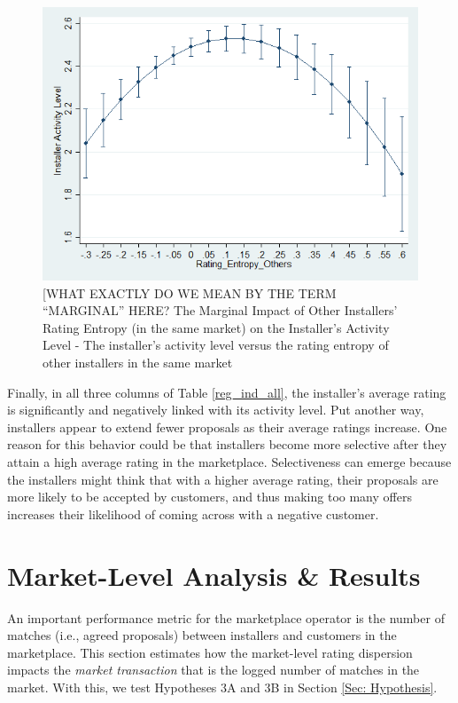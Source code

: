 \documentclass[msom,blindrev]{informs3}
\begin{document}
\begin{figure}
	\centering
	\includegraphics[width=0.7\linewidth]{marginsplot_entothers.png}
	\caption{ [WHAT EXACTLY DO WE MEAN BY THE TERM ``MARGINAL'' HERE? The Marginal Impact of Other Installers' Rating Entropy (in the same market) on the Installer's Activity Level - The installer's activity level versus the rating entropy of other installers in the same market}
	\label{fig: marginsplot_ind_ent_others}
\end{figure}





Finally, in all three columns of Table \ref{reg_ind_all}, the installer's average rating is significantly and negatively linked with its activity level. Put another way, installers appear to extend fewer proposals as their average ratings increase. One reason for this behavior could be that  installers become more selective after they attain a high average rating in the marketplace. Selectiveness can emerge because the installers might think that with a higher average rating, their proposals are more likely to be accepted by customers, and thus making too many offers increases their likelihood of coming across with a negative customer.

\section{Market-Level Analysis \& Results} \label{Sec: Market-level}

An important performance metric for the marketplace operator is the number of matches (i.e., agreed proposals) between installers and customers in the marketplace. This section estimates how the market-level rating dispersion impacts the \emph{market transaction} that is the logged number of matches in the market. With this, we test Hypotheses 3A and 3B in Section \ref{Sec: Hypothesis}.
\end{document}
